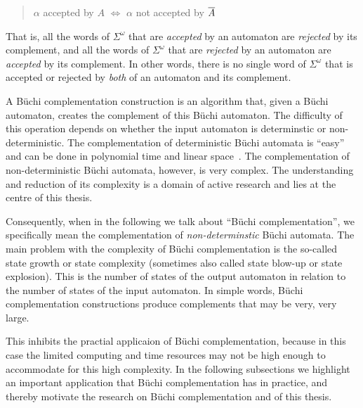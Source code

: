 \begin{quote}
\centering
$\alpha$ accepted by $A$ $\Longleftrightarrow$ $\alpha$ not accepted by $\cl1{A}$
\end{quote}

That is, all the words of $\Sigma^\omega$ that are \textit{accepted} by an automaton are \textit{rejected} by its complement, and all the words of $\Sigma^\omega$ that are \textit{rejected} by an automaton are \textit{accepted} by its complement. In other words, there is no single word of $\Sigma^\omega$ that is  accepted or rejected by \textit{both} of an automaton and its complement.

A Büchi complementation construction is an algorithm that, given a Büchi automaton, creates the complement of this Büchi automaton. The difficulty of this operation depends on whether the input automaton is determinstic or non-deterministic. The complementation of deterministic Büchi automata is ``easy'' and can be done in polynomial time and linear space~\cite{Kurshan198759}. The complementation of non-deterministic Büchi automata, however, is very complex. The understanding and reduction of its complexity is a domain of active research and lies at the centre of this thesis.

Consequently, when in the following we talk about ``Büchi complementation'', we specifically mean the complementation of \textit{non-determinstic} Büchi automata. The main problem with the complexity of Büchi complementation is the so-called state growth or state complexity (sometimes also called state blow-up or state explosion). This is the number of states of the output automaton in relation to the number of states of the input automaton. In simple words, Büchi complementation constructions produce complements that may be very, very large.

This inhibits the practial applicaion of Büchi complementation, because in this case the limited computing and time resources may not be high enough to accommodate for this high complexity. In the following subsections we highlight an important application that Büchi complementation has in practice, and thereby motivate the research on Büchi complementation and of this thesis.

